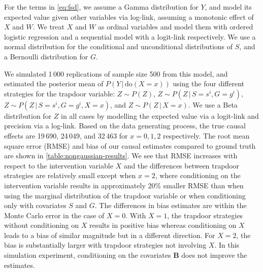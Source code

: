 \documentclass[11pt,a4paper,twoside]{article}
\newcommand{\+}[1]{\ensuremath{\mathbf{#1}}}
\newcommand{\doo}{\textrm{do}}
\newcommand{\given}{{ \, | \, }}
\begin{document}
	For the terms in \eqref{eq:fsd}, we assume a Gamma distribution for $Y$, and model its expected value given other variables via log-link, assuming a monotonic effect \citep{burkner2018} of $X$ and $W$. We treat $X$ and $W$ as ordinal variables and model them with ordered logistic regression and a sequential model with a logit-link \citep{Tutz1990, burkner2019} respectively. We use a normal distribution for the conditional and unconditional distributions of $S$, and a Bernoulli distribution for $G$. 
	
	We simulated 1\,000 replications of sample size 500 from this model, and estimated the posterior mean of $P(Y \given \doo(X = x))$ using the four different strategies for the trapdoor variable: $Z \sim P(Z)$, $Z \sim P(Z \given S = s^i, G = g^i)$, $Z \sim P(Z \given S = s^i, G = g^i, X = x)$, and $Z \sim P(Z \given X = x)$. We use a Beta distribution for $Z$ in all cases by modelling the expected value via a logit-link and precision via a log-link. Based on the data generating process, the true causal effects are 19\,690, 24\,049, and 32\,463 for $x=0,1,2$ respectively. The root mean square error (RMSE) and bias of our causal estimates compared to ground truth are shown in \autoref{table:nongaussian-results}. We see that RMSE increases with respect to the intervention variable $X$ and the differences between trapdoor strategies are relatively small except when $x=2$, where conditioning on the intervention variable results in approximately 20\% smaller RMSE than when using the marginal distribution of the trapdoor variable or when conditioning only with covariates $S$ and $G$. The differences in bias estimates are within the Monte Carlo error in the case of $X=0$. With $X=1$, the trapdoor strategies without conditioning on $X$ results in positive bias whereas conditioning on $X$ leads to a bias of similar magnitude but in a different direction. For $X=2$, the bias is substantially larger with trapdoor strategies not involving $X$. In this simulation experiment, conditioning on the covariates $\+ B$ does not improve the estimates. 
\end{document}
